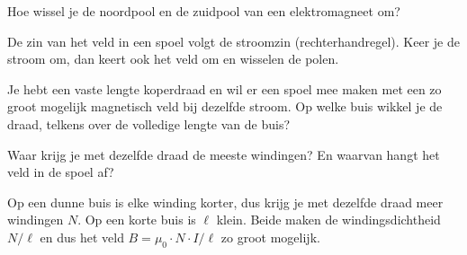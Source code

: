 \documentclass{ximera}
\begin{document}
\begin{question}
    Hoe wissel je de noordpool en de zuidpool van een elektromagneet om?

    \begin{multipleChoice}
    \end{multipleChoice}

    \begin{solution}\nl
        De zin van het veld in een spoel volgt de stroomzin (rechterhandregel). Keer je de stroom om, dan keert ook het veld om en wisselen de polen.
    \end{solution}
\end{question}

\begin{question}
    Je hebt een vaste lengte koperdraad en wil er een spoel mee maken met een zo groot mogelijk magnetisch veld bij dezelfde stroom. Op welke buis wikkel je de draad, telkens over de volledige lengte van de buis?

    \begin{multipleChoice}
    \end{multipleChoice}

    \begin{hint}
        Waar krijg je met dezelfde draad de meeste windingen? En waarvan hangt het veld in de spoel af?
    \end{hint}

    \begin{solution}\nl
        Op een dunne buis is elke winding korter, dus krijg je met dezelfde draad meer windingen $N$. Op een korte buis is $\ell$ klein. Beide maken de windingsdichtheid $N/\ell$ en dus het veld $B = \mu_0 \cdot N \cdot I/\ell$ zo groot mogelijk.
    \end{solution}
\end{question}
\end{document}
